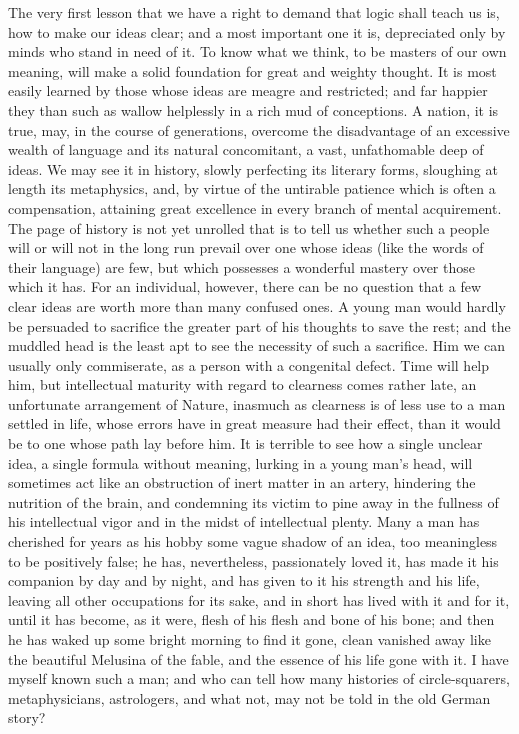 \documentclass[]{article}
\begin{document}
The very first lesson that we have a right to demand that logic shall teach us is, how to make our ideas clear; and a most important one it is, depreciated only by minds who stand in need of it. To know what we think, to be masters of our own meaning, will make a solid foundation for great and weighty thought. It is most easily learned by those whose ideas are meagre and restricted; and far happier they than such as wallow helplessly in a rich mud of conceptions. A nation, it is true, may, in the course of generations, overcome the disadvantage of an excessive wealth of language and its natural concomitant, a vast, unfathomable deep of ideas. We may see it in history, slowly perfecting its literary forms, sloughing at length its metaphysics, and, by virtue of the untirable patience which is often a compensation, attaining great excellence in every branch of mental acquirement. The page of history is not yet unrolled that is to tell us whether such a people will or will not in the long run prevail over one whose ideas (like the words of their language) are few, but which  possesses a wonderful mastery over those which it has. For an individual, however, there can be no question that a few clear ideas are worth more than many confused ones. A young man would hardly be persuaded to sacrifice the greater part of his thoughts to save the rest; and the muddled head is the least apt to see the necessity of such a sacrifice. Him we can usually only commiserate, as a person with a congenital defect. Time will help him, but intellectual maturity with regard to clearness comes rather late, an unfortunate arrangement of Nature, inasmuch as clearness is of less use to a man settled in life, whose  errors have in great measure had their effect, than it would be to one whose path lay before him. It is terrible to see how a single unclear idea, a single formula without meaning, lurking in a young man's head, will sometimes act like an obstruction of inert matter in an artery, hindering the nutrition of the brain, and condemning its victim to pine away in the fullness of his intellectual vigor and in the midst of intellectual plenty. Many a man has cherished for years as his hobby some vague shadow of an idea, too meaningless to be positively false; he has, nevertheless, passionately loved it, has made it his companion by day and by night, and has given to it his strength and his life, leaving all other occupations for its sake, and in short has lived with it and for it, until it has become, as it were, flesh of his flesh and bone of his bone; and then he has waked up some bright morning to find it gone, clean vanished away like the beautiful Melusina of the fable, and the essence of his life gone with it. I have myself known such a man; and who can tell how many histories of circle-squarers, metaphysicians, astrologers, and what not, may not be told in the old German story?
\end{document}
